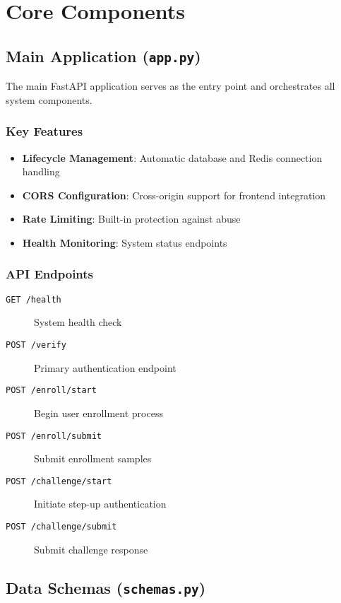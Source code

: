 \documentclass[12pt,a4paper]{article}
\begin{document}
\section{Core Components}

\subsection{Main Application (\texttt{app.py})}

The main FastAPI application serves as the entry point and orchestrates all system components.

\subsubsection{Key Features}
\begin{itemize}
    \item \textbf{Lifecycle Management}: Automatic database and Redis connection handling
    \item \textbf{CORS Configuration}: Cross-origin support for frontend integration
    \item \textbf{Rate Limiting}: Built-in protection against abuse
    \item \textbf{Health Monitoring}: System status endpoints
\end{itemize}

\subsubsection{API Endpoints}
\begin{description}
    \item[\texttt{GET /health}] System health check
    \item[\texttt{POST /verify}] Primary authentication endpoint
    \item[\texttt{POST /enroll/start}] Begin user enrollment process
    \item[\texttt{POST /enroll/submit}] Submit enrollment samples
    \item[\texttt{POST /challenge/start}] Initiate step-up authentication
    \item[\texttt{POST /challenge/submit}] Submit challenge response
\end{description}

\subsection{Data Schemas (\texttt{schemas.py})}
\end{document}
